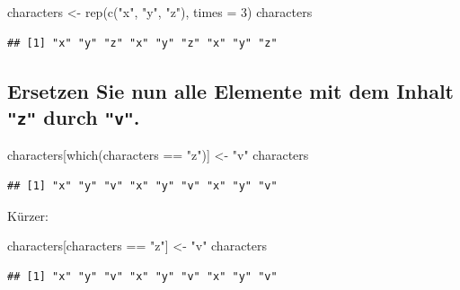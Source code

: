 \documentclass[12pt,a4paper]{article}
\newenvironment{Shaded}{\begin{snugshade}}{\end{snugshade}}
\newcommand{\AttributeTok}[1]{\textcolor[rgb]{0.77,0.63,0.00}{#1}}
\newcommand{\DecValTok}[1]{\textcolor[rgb]{0.00,0.00,0.81}{#1}}
\newcommand{\FunctionTok}[1]{\textcolor[rgb]{0.00,0.00,0.00}{#1}}
\newcommand{\NormalTok}[1]{#1}
\newcommand{\OtherTok}[1]{\textcolor[rgb]{0.56,0.35,0.01}{#1}}
\newcommand{\SpecialCharTok}[1]{\textcolor[rgb]{0.00,0.00,0.00}{#1}}
\newcommand{\StringTok}[1]{\textcolor[rgb]{0.31,0.60,0.02}{#1}}
\begin{document}
\begin{Shaded}
\begin{Highlighting}[]
\NormalTok{    characters }\OtherTok{\textless{}{-}} \FunctionTok{rep}\NormalTok{(}\FunctionTok{c}\NormalTok{(}\StringTok{"x"}\NormalTok{, }\StringTok{"y"}\NormalTok{, }\StringTok{"z"}\NormalTok{), }\AttributeTok{times =} \DecValTok{3}\NormalTok{)}
\NormalTok{    characters}
\end{Highlighting}
\end{Shaded}

\begin{verbatim}
## [1] "x" "y" "z" "x" "y" "z" "x" "y" "z"
\end{verbatim}

\vspace{0.5cm}

\hypertarget{ersetzen-sie-nun-alle-elemente-mit-dem-inhalt-durch-.}{%
\subsection{\texorpdfstring{Ersetzen Sie nun alle Elemente mit dem
Inhalt \texttt{"z"} durch
\texttt{"v"}.}{Ersetzen Sie nun alle Elemente mit dem Inhalt  durch .}}\label{ersetzen-sie-nun-alle-elemente-mit-dem-inhalt-durch-.}}

\begin{Shaded}
\begin{Highlighting}[]
\NormalTok{    characters[}\FunctionTok{which}\NormalTok{(characters }\SpecialCharTok{==} \StringTok{"z"}\NormalTok{)] }\OtherTok{\textless{}{-}} \StringTok{"v"}
\NormalTok{    characters}
\end{Highlighting}
\end{Shaded}

\begin{verbatim}
## [1] "x" "y" "v" "x" "y" "v" "x" "y" "v"
\end{verbatim}

Kürzer:

\begin{Shaded}
\begin{Highlighting}[]
\NormalTok{    characters[characters }\SpecialCharTok{==} \StringTok{"z"}\NormalTok{] }\OtherTok{\textless{}{-}} \StringTok{"v"}
\NormalTok{    characters}
\end{Highlighting}
\end{Shaded}

\begin{verbatim}
## [1] "x" "y" "v" "x" "y" "v" "x" "y" "v"
\end{verbatim}
\end{document}
